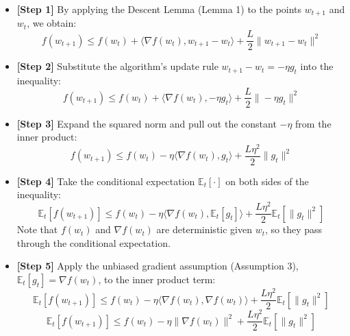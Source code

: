 \documentclass{article}
\begin{document}
\begin{itemize}
    \item \textbf{[Step 1]} By applying the Descent Lemma (Lemma 1) to the points $w_{t+1}$ and $w_t$, we obtain:
    \begin{equation}
        f(w_{t+1}) \leq f(w_t) + \langle \nabla f(w_t), w_{t+1} - w_t \rangle + \frac{L}{2} \|w_{t+1} - w_t\|^2
    \end{equation}
    
    \item \textbf{[Step 2]} Substitute the algorithm's update rule $w_{t+1} - w_t = -\eta g_t$ into the inequality:
    \begin{equation}
        f(w_{t+1}) \leq f(w_t) + \langle \nabla f(w_t), -\eta g_t \rangle + \frac{L}{2} \|-\eta g_t\|^2
    \end{equation}
    
    \item \textbf{[Step 3]} Expand the squared norm and pull out the constant $-\eta$ from the inner product:
    \begin{equation}
        f(w_{t+1}) \leq f(w_t) - \eta \langle \nabla f(w_t), g_t \rangle + \frac{L \eta^2}{2} \|g_t\|^2
    \end{equation}
    
    \item \textbf{[Step 4]} Take the conditional expectation $\mathbb{E}_t[\cdot]$ on both sides of the inequality:
    \begin{equation}
        \mathbb{E}_t[f(w_{t+1})] \leq f(w_t) - \eta \langle \nabla f(w_t), \mathbb{E}_t[g_t] \rangle + \frac{L \eta^2}{2} \mathbb{E}_t[\|g_t\|^2]
    \end{equation}
    Note that $f(w_t)$ and $\nabla f(w_t)$ are deterministic given $w_t$, so they pass through the conditional expectation.
    
    \item \textbf{[Step 5]} Apply the unbiased gradient assumption (Assumption 3), $\mathbb{E}_t[g_t] = \nabla f(w_t)$, to the inner product term:
    \begin{equation}
        \mathbb{E}_t[f(w_{t+1})] \leq f(w_t) - \eta \langle \nabla f(w_t), \nabla f(w_t) \rangle + \frac{L \eta^2}{2} \mathbb{E}_t[\|g_t\|^2]
    \end{equation}
    \begin{equation}
        \mathbb{E}_t[f(w_{t+1})] \leq f(w_t) - \eta \|\nabla f(w_t)\|^2 + \frac{L \eta^2}{2} \mathbb{E}_t[\|g_t\|^2]
    \end{equation}
    

\end{itemize}
\end{document}
